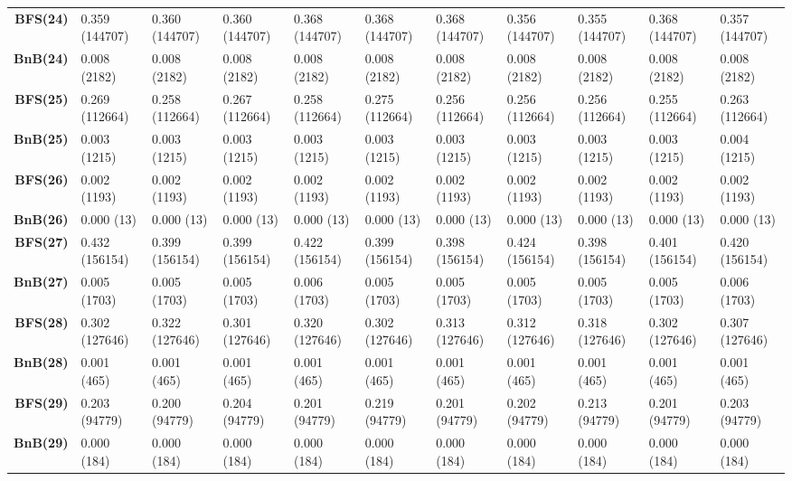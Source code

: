 \begin{table}[ht]
\begin{adjustbox}{width=1.5\textwidth,center}
\begin{tabular}{r|llllllllll}
\textbf{BFS(24)} & 0.359 (144707) & 0.360 (144707) & 0.360 (144707) & 0.368 (144707) & 0.368 (144707) & 0.368 (144707) & 0.356 (144707) & 0.355 (144707) & 0.368 (144707) & 0.357 (144707) \\
\textbf{BnB(24)} & 0.008 (2182) & 0.008 (2182) & 0.008 (2182) & 0.008 (2182) & 0.008 (2182) & 0.008 (2182) & 0.008 (2182) & 0.008 (2182) & 0.008 (2182) & 0.008 (2182) \\ \hline

\textbf{BFS(25)} & 0.269 (112664) & 0.258 (112664) & 0.267 (112664) & 0.258 (112664) & 0.275 (112664) & 0.256 (112664) & 0.256 (112664) & 0.256 (112664) & 0.255 (112664) & 0.263 (112664) \\
\textbf{BnB(25)} & 0.003 (1215) & 0.003 (1215) & 0.003 (1215) & 0.003 (1215) & 0.003 (1215) & 0.003 (1215) & 0.003 (1215) & 0.003 (1215) & 0.003 (1215) & 0.004 (1215) \\ \hline

\textbf{BFS(26)} & 0.002 (1193) & 0.002 (1193) & 0.002 (1193) & 0.002 (1193) & 0.002 (1193) & 0.002 (1193) & 0.002 (1193) & 0.002 (1193) & 0.002 (1193) & 0.002 (1193) \\
\textbf{BnB(26)} & 0.000 (13) & 0.000 (13) & 0.000 (13) & 0.000 (13) & 0.000 (13) & 0.000 (13) & 0.000 (13) & 0.000 (13) & 0.000 (13) & 0.000 (13) \\ \hline

\textbf{BFS(27)} & 0.432 (156154) & 0.399 (156154) & 0.399 (156154) & 0.422 (156154) & 0.399 (156154) & 0.398 (156154) & 0.424 (156154) & 0.398 (156154) & 0.401 (156154) & 0.420 (156154) \\
\textbf{BnB(27)} & 0.005 (1703) & 0.005 (1703) & 0.005 (1703) & 0.006 (1703) & 0.005 (1703) & 0.005 (1703) & 0.005 (1703) & 0.005 (1703) & 0.005 (1703) & 0.006 (1703) \\ \hline

\textbf{BFS(28)} & 0.302 (127646) & 0.322 (127646) & 0.301 (127646) & 0.320 (127646) & 0.302 (127646) & 0.313 (127646) & 0.312 (127646) & 0.318 (127646) & 0.302 (127646) & 0.307 (127646) \\
\textbf{BnB(28)} & 0.001 (465) & 0.001 (465) & 0.001 (465) & 0.001 (465) & 0.001 (465) & 0.001 (465) & 0.001 (465) & 0.001 (465) & 0.001 (465) & 0.001 (465) \\ \hline

\textbf{BFS(29)} & 0.203 (94779) & 0.200 (94779) & 0.204 (94779) & 0.201 (94779) & 0.219 (94779) & 0.201 (94779) & 0.202 (94779) & 0.213 (94779) & 0.201 (94779) & 0.203 (94779) \\
\textbf{BnB(29)} & 0.000 (184) & 0.000 (184) & 0.000 (184) & 0.000 (184) & 0.000 (184) & 0.000 (184) & 0.000 (184) & 0.000 (184) & 0.000 (184) & 0.000 (184) \\ \hline


\end{tabular}
\end{adjustbox}
\end{table}
